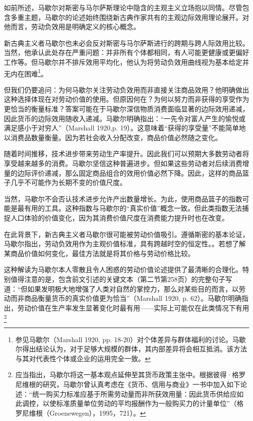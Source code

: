 \begin{translation}
如前所述，马歇尔对斯密与马尔萨斯理论中隐含的主观主义立场抱以同情。尽管包含多重主题，马歇尔的论述始终围绕新古典作家共有的主观边际效用理论展开。对他而言，劳动负效用是明确定义的核心概念。

新古典主义者马歇尔也未必会反对斯密与马尔萨斯进行的跨期与跨人际效用比较。当然，他承认此处存在严重问题：并非所有个体都相同，有人可能更健康或更偏好工作等。但马歇尔并不排斥效用平均化，他认为将劳动负效用曲线视为基本给定并无内在困难\footnote{参见马歇尔（Marshall 1920, pp. 18-20）对个体差异与群体福利的讨论。马歇尔得出结论认为，对于足够大规模的群体，其内部差异将会相互抵消。该方法与其对代表性个体或企业的运用完全一致。}。

但我们仍要追问：为何马歇尔关注劳动负效用而非直接关注商品效用？他明确做出这种选择体现在对劳动价值的使用。但原因何在？为何以努力而非获得的享受作为更恰当的衡量标准？答案可能在于马歇尔深信物质消费面临显著的边际效用递减，因此货币的边际效用随收入递减。马歇尔明确指出：“一先令对富人产生的愉悦或满足感小于对穷人”（Marshall 1920,p. 19）。这意味着“获得的享受量”不能简单地以消费品数量衡量。因为若社会收入分配改变，商品价值必然随之变化。

随着时间推移，技术进步带来劳动生产率提升。因此我们可以预期大多数劳动者将享受越来越多的消费。马歇尔坚信这种普遍进步。但如果这些劳动者对后续消费增量的边际评价递减，那么固定商品组合的效用价值必然下降。因此，这样的商品篮子几乎不可能作为长期不变的价值尺度。

当然，马歇尔不会否认技术进步允许产出数量增长。为此，使用商品篮子的指数可能是最有用的工具。这种指数与马歇尔的“真实价值”概念一致。但此类指数无法捕捉人口体验的价值变化，因为其消费价值尺度在消费能力提升时也在改变。

在此背景下，新古典主义者马歇尔很可能被劳动价值吸引。遵循斯密的基本论证，马歇尔指出，劳动负效用作为主观价值标准，具有跨越时空的恒定性。。若想了解某商品价值如何变化，最佳方法就是将其价格与劳动价格比较。

这种解读为马歇尔本人零散且令人困惑的劳动价值论述提供了最清晰的合理化。特别值得注意的是，包含前文引述的关键文本（第二节第258页）的完整句子写道：“但如果发明极大地增强了人类对自然的掌控力，那么对某些目的而言，以劳动而非商品衡量货币的真实价值更为恰当”（Marshall 1920, p. 62）。马歇尔明确指出，劳动价值在生产率发生显著变化时最有用——实际上可能仅在此类情况下有用\footnote{应当指出，马歇尔将这一基本观点延伸至其货币政策主张中。根据彼得·格罗尼维根的研究，马歇尔曾认真考虑在《货币、信用与商业》一书中加入如下论述：​“统一购买力标准应基于所需劳动量而非所获效用量：因此货币供给应如此调控，以使标准质量单位劳动的平均报酬作为一般购买力的计量单位”（格罗尼维根（Groenewegen），1995，721）。 

}
\end{translation}
